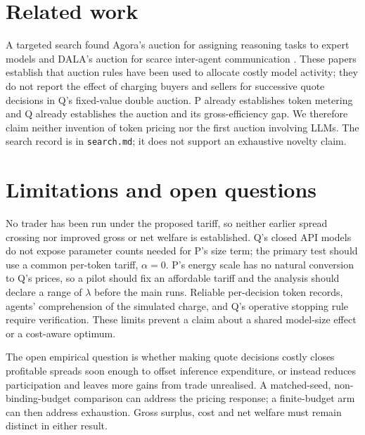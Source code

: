 \documentclass{article}
\begin{document}
\section{Related work}
A targeted search found Agora's auction for assigning reasoning tasks to expert models \cite{zhou2026agora} and DALA's auction for scarce inter-agent communication \cite{fan2025communication}. These papers establish that auction rules have been used to allocate costly model activity; they do not report the effect of charging buyers and sellers for successive quote decisions in Q's fixed-value double auction. P already establishes token metering and Q already establishes the auction and its gross-efficiency gap. We therefore claim neither invention of token pricing nor the first auction involving LLMs. The search record is in \texttt{search.md}; it does not support an exhaustive novelty claim. %

\clearpage
\section{Limitations and open questions}
No trader has been run under the proposed tariff, so neither earlier spread crossing nor improved gross or net welfare is established. Q's closed API models do not expose parameter counts needed for P's size term; the primary test should use a common per-token tariff, \(\alpha=0\). P's energy scale has no natural conversion to Q's prices, so a pilot should fix an affordable tariff and the analysis should declare a range of \(\lambda\) before the main runs. Reliable per-decision token records, agents' comprehension of the simulated charge, and Q's operative stopping rule require verification. These limits prevent a claim about a shared model-size effect or a cost-aware optimum. %

The open empirical question is whether making quote decisions costly closes profitable spreads soon enough to offset inference expenditure, or instead reduces participation and leaves more gains from trade unrealised. A matched-seed, non-binding-budget comparison can address the pricing response; a finite-budget arm can then address exhaustion. Gross surplus, cost and net welfare must remain distinct in either result. %



\end{document}
